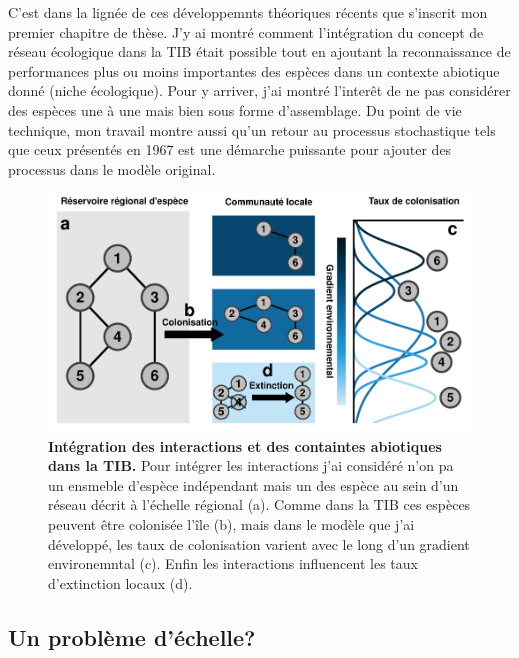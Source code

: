 C'est dans la lignée de ces développemnts théoriques récents que
s'inscrit mon premier chapitre de thèse. J'y ai montré comment
l'intégration du concept de réseau écologique dans la TIB était possible
tout en ajoutant la reconnaissance de performances plus ou moins
importantes des espèces dans un contexte abiotique donné (niche
écologique). Pour y arriver, j'ai montré l'interêt de ne pas considérer
des espèces une à une mais bien sous forme d'assemblage. Du point de vie
technique, mon travail montre aussi qu'un retour au processus
stochastique tels que ceux présentés en 1967 est une démarche puissante
pour ajouter des processus dans le modèle original.

\begin{figure}[htbp]
\centering
\includegraphics{fig/fig2.pdf}
\caption{\textbf{Intégration des interactions et des containtes
abiotiques dans la TIB.} Pour intégrer les interactions j'ai considéré
n'on pa un ensmeble d'espèce indépendant mais un des espèce au sein d'un
réseau décrit à l'échelle régional (a). Comme dans la TIB ces espèces
peuvent être colonisée l'île (b), mais dans le modèle que j'ai
développé, les taux de colonisation varient avec le long d'un gradient
environemntal (c). Enfin les interactions influencent les taux
d'extinction locaux (d).\label{fig:figGTIB}}
\end{figure}

\subsection*{Un problème d'échelle?}\label{un-probluxe8me-duxe9chelle}

